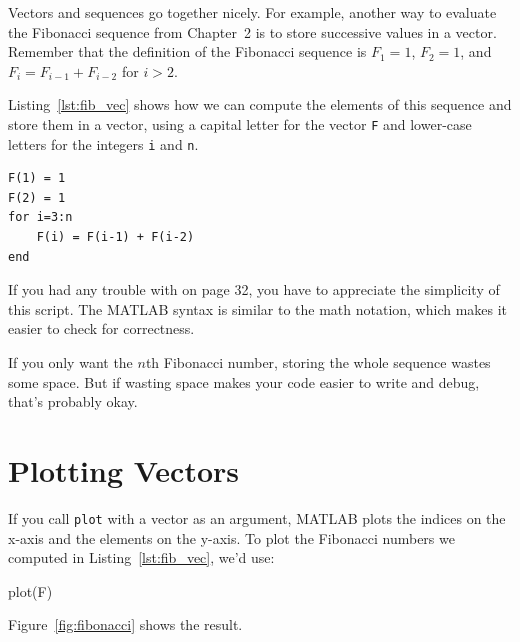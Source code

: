 
Vectors and sequences go together nicely.
For example, another way to evaluate the Fibonacci sequence from Chapter~2 is to
store successive values in a vector.  Remember that the definition of the
Fibonacci sequence is $F_1 = 1$, $F_2 = 1$, and
$F_{i} = F_{i-1} + F_{i-2}$ for $i > 2$.

Listing~\ref{lst:fib_vec} shows how we can compute the elements of this sequence and store them in a vector, using a capital letter for the vector \lstinline{F}
and lower-case letters for the integers \lstinline{i} and \lstinline{n}.

\begin{lstlisting}[caption={Calculating the Fibonacci sequence using a vector}, label={lst:fib_vec}]
F(1) = 1
F(2) = 1
for i=3:n
    F(i) = F(i-1) + F(i-2)
end
\end{lstlisting}

If you had any trouble with  on page 32, you have to
appreciate the simplicity of this script.  The MATLAB syntax is
similar to the math notation, which makes it easier to check for
correctness.  

If you only want the $n$th Fibonacci number, storing
the whole sequence wastes some space.  But if wasting space
makes your code easier to write and debug, that's probably okay.


\section{Plotting Vectors}


If you call \lstinline{plot} with a vector as an argument,
MATLAB plots the indices on the x-axis and the elements on the
y-axis.  To plot the Fibonacci numbers we computed in Listing~\ref{lst:fib_vec}, we'd use:

\begin{code}
plot(F)
\end{code}

Figure~\ref{fig:fibonacci} shows the result.

